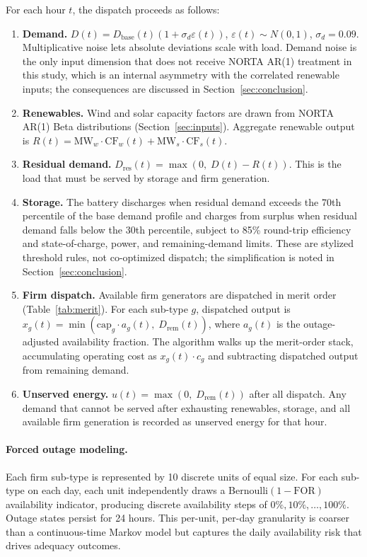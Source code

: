 \documentclass[11pt]{article}
\begin{document}
For each hour $t$, the dispatch proceeds as follows:

\begin{enumerate}[leftmargin=*, itemsep=2pt]
  \item \textbf{Demand.} $D(t) = D_{\text{base}}(t)(1 + \sigma_d \varepsilon(t))$, $\varepsilon(t) \sim N(0,1)$, $\sigma_d = 0.09$. Multiplicative noise lets absolute deviations scale with load. Demand noise is the only input dimension that does not receive NORTA AR(1) treatment in this study, which is an internal asymmetry with the correlated renewable inputs; the consequences are discussed in Section~\ref{sec:conclusion}.
  \item \textbf{Renewables.} Wind and solar capacity factors are drawn from NORTA AR(1) Beta distributions (Section~\ref{sec:inputs}). Aggregate renewable output is $R(t) = \text{MW}_w \cdot \text{CF}_w(t) + \text{MW}_s \cdot \text{CF}_s(t)$.
  \item \textbf{Residual demand.} $D_{\text{res}}(t) = \max(0,\; D(t) - R(t))$. This is the load that must be served by storage and firm generation.
  \item \textbf{Storage.} The battery discharges when residual demand exceeds the 70th percentile of the base demand profile and charges from surplus when residual demand falls below the 30th percentile, subject to 85\% round-trip efficiency and state-of-charge, power, and remaining-demand limits. These are stylized threshold rules, not co-optimized dispatch; the simplification is noted in Section~\ref{sec:conclusion}.
  \item \textbf{Firm dispatch.} Available firm generators are dispatched in merit order (Table~\ref{tab:merit}). For each sub-type $g$, dispatched output is $x_g(t) = \min(\text{cap}_g \cdot a_g(t),\; D_{\text{rem}}(t))$, where $a_g(t)$ is the outage-adjusted availability fraction. The algorithm walks up the merit-order stack, accumulating operating cost as $x_g(t) \cdot c_g$ and subtracting dispatched output from remaining demand.
  \item \textbf{Unserved energy.} $u(t) = \max(0,\; D_{\text{rem}}(t))$ after all dispatch. Any demand that cannot be served after exhausting renewables, storage, and all available firm generation is recorded as unserved energy for that hour.
\end{enumerate}

\paragraph{Forced outage modeling.}
Each firm sub-type is represented by 10 discrete units of equal size. For each sub-type on each day, each unit independently draws a Bernoulli$(1 - \text{FOR})$ availability indicator, producing discrete availability steps of $0\%, 10\%, \ldots, 100\%$. Outage states persist for 24 hours. This per-unit, per-day granularity is coarser than a continuous-time Markov model but captures the daily availability risk that drives adequacy outcomes.
\end{document}
